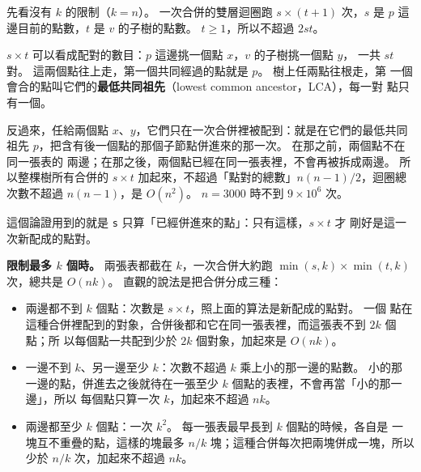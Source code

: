 先看沒有 $k$ 的限制（$k = n$）。 一次合併的雙層迴圈跑 $s \times (t + 1)$ 次，$s$
是 $p$ 這邊目前的點數，$t$ 是 $v$ 的子樹的點數。 $t \ge 1$，所以不超過 $2st$。

$s \times t$ 可以看成配對的數目：$p$ 這邊挑一個點 $x$，$v$ 的子樹挑一個點 $y$，
一共 $st$ 對。 這兩個點往上走，第一個共同經過的點就是 $p$。 樹上任兩點往根走，第
一個會合的點叫它們的\textbf{最低共同祖先}（lowest common ancestor，LCA），每一對
點只有一個。

\begin{center}
\begin{minipage}{\linewidth}
\centering
{}
\label{fig:tdp-pairs}
\end{minipage}
\end{center}

反過來，任給兩個點 $x$、$y$，它們只在一次合併裡被配到：就是在它們的最低共同祖先
$p$，把含有後一個點的那個子節點併進來的那一次。 在那之前，兩個點不在同一張表的
兩邊；在那之後，兩個點已經在同一張表裡，不會再被拆成兩邊。 所以整棵樹所有合併的
$s \times t$ 加起來，不超過「點對的總數」$n(n - 1) / 2$，迴圈總次數不超過
$n(n - 1)$，是 $O(n^2)$。 $n = 3000$ 時不到 $9 \times 10^6$ 次。

這個論證用到的就是 \texttt{s} 只算「已經併進來的點」：只有這樣，$s \times t$ 才
剛好是這一次新配成的點對。

\textbf{限制最多 $k$ 個時。} 兩張表都截在 $k$，一次合併大約跑 $\min(s, k) \times
\min(t, k)$ 次，總共是 $O(nk)$。 直觀的說法是把合併分成三種：

\begin{itemize}
\item 兩邊都不到 $k$ 個點：次數是 $s \times t$，照上面的算法是新配成的點對。 一個
點在這種合併裡配到的對象，合併後都和它在同一張表裡，而這張表不到 $2k$ 個點；所
以每個點一共配到少於 $2k$ 個對象，加起來是 $O(nk)$。
\item 一邊不到 $k$、另一邊至少 $k$：次數不超過 $k$ 乘上小的那一邊的點數。 小的那
一邊的點，併進去之後就待在一張至少 $k$ 個點的表裡，不會再當「小的那一邊」，所以
每個點只算一次 $k$，加起來不超過 $nk$。
\item 兩邊都至少 $k$ 個點：一次 $k^2$。 每一張表最早長到 $k$ 個點的時候，各自是
一塊互不重疊的點，這樣的塊最多 $n / k$ 塊；這種合併每次把兩塊併成一塊，所以少於
$n / k$ 次，加起來不超過 $nk$。
\end{itemize}

